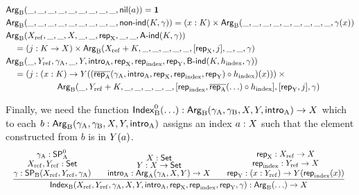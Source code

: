 \documentclass{article}
\begin{document}
\begin{align*} 
&  \mathsf{Arg}_{\mathrm{B}}(\_, \_, \_, \_, \_, \_, \_, \_, \_, \mathsf{nil}(a)) = \mathbf{1} \\
&  \mathsf{Arg}_{\mathrm{B}}(\_, \_, \_, \_, \_, \_, \_, \_, \_, \mathsf{non}\text{-}\mathsf{ind}(K, \gamma)) 
= (x : K) \times \mathsf{Arg}_{\mathrm{B}}(\_, \_, \_, \_, \_, \_, \_, \_, \_, \gamma(x)) \\
&  \mathsf{Arg}_{\mathrm{B}}(X_{\mathrm{ref}}, \_, \_, X, \_, \_, \mathsf{rep}_{\mathrm{X}}, \_, \_, \mathsf{A}\text{-}\mathsf{ind}(K, \gamma)) \\
&\quad=  (j : K \to X) \times \mathsf{Arg}_{\mathrm{B}}(X_{\mathrm{ref}} + K, \_, \_, \_, \_, \_,  [\mathsf{rep}_{\mathrm{X}}, j], \_, \_, \gamma) \\
&  \mathsf{Arg}_{\mathrm{B}}(\_, Y_{\mathrm{ref}}, \gamma_{\mathrm{A}}, \_, Y, \mathsf{intro}_{\mathrm{A}}, \mathsf{rep}_{\mathrm{X}}, \mathsf{rep}_{\mathrm{index}}, \mathsf{rep}_{\mathrm{Y}}, \mathsf{B}\text{-}\mathsf{ind}(K, h_{\mathrm{index}}, \gamma)) \\
&\quad= (j : (x : K) \to Y((\overline{\mathsf{rep}_{\mathrm{A}}}(\gamma_{\mathrm{A}}, \mathsf{intro}_{\mathrm{A}}, \mathsf{rep}_{\mathrm{X}}, \mathsf{rep}_{\mathrm{index}}, \mathsf{rep}_{\mathrm{Y}}) \circ h_{\mathrm{index}})(x))) \times {} \\ 
& \qquad\qquad\qquad   \mathsf{Arg}_{\mathrm{B}}(\_, Y_{\mathrm{ref}} + K, \_, \_, \_, \_, \_, [\mathsf{rep}_{\mathrm{index}}, \overline{\mathsf{rep}_{\mathrm{A}}}(\ldots) \circ h_{\mathrm{index}}], [\mathsf{rep}_{\mathrm{Y}}, j], \gamma)
\end{align*}


Finally, we need the function $\mathsf{Index}^{0}_{\mathrm{B}}(\ldots) : \mathsf{Arg}_{\mathrm{B}}(\gamma_{\mathrm{A}}, \gamma_{\mathrm{B}}, X, Y,
\mathsf{intro}_{\mathrm{A}}) \to X$ which to each $b : \mathsf{Arg}_{\mathrm{B}}(\gamma_{\mathrm{A}}, \gamma_{\mathrm{B}}, X, Y,
\mathsf{intro}_{\mathrm{A}})$ assigns an index $a : X$ such that the element constructed
from $b$ is in $Y(a)$.
%
\[
\resizebox{\textwidth}{!}{%
$
\infer{\IndexB(\Xref, \Yref, \gammaA, \A, \B, \introA, \repA, \repIndex, \repB, \gamma) : \ArgB(\ldots) \to \A}
             {\deduce{\gamma : \SPB(\Xref, \Yref, \gammaA)}
                     {\deduce{\Xref, \Yref : \Set}{\gammaA : \SPAp}}
      & \quad \deduce{\introA : \ArgA(\gammaA, \A, \B) \to \A}
                     {\deduce{\B : \A \to \Set}{\A : \Set}}
              & \quad \deduce{\repB: (x : \Yref) \to \B(\repIndex(x))}
                             {\deduce{\repIndex : \Yref \to \A}
                                     {\repA : \Xref \to \A}}}
$
}
\]
\end{document}

